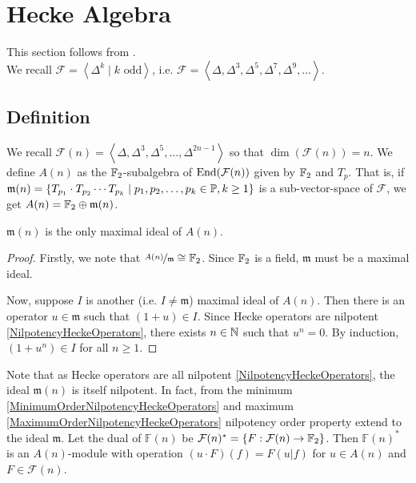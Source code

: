 \section{Hecke Algebra}
This section follows from \cite{StructureAlgebreHecke}.\\
We recall $\mathcal{F} = \left\langle \Delta^k \mid k \text{ odd} \right\rangle$, i.e. $\mathcal{F} = \left\langle \Delta, \Delta^3, \Delta^5, \Delta^7, \Delta^9, \dots \right\rangle$.
\subsection{Definition}
We recall $ \mathcal{F}(n) = \left\langle \Delta, \Delta^3, \Delta^5, \dots, \Delta^{2n-1} \right\rangle $ so that $\dim(\mathcal{F}(n)) = n$.
We define $A(n)$ as the $\mathbb{F}_2$-subalgebra of $\text{End}(\mathcal{F}(n))$ given by $\mathbb{F}_2$ and $T_p$.
That is, if $\mathfrak{m}(n) = \{T_{p_1} \cdot T_{p_2} \cdots T_{p_k} \mid p_1, p_2, \dots, p_k \in \mathbb{P}, k\geq 1\}$ is a sub-vector-space of $\mathcal{F}$, we get $A(n) = \mathbb{F}_2 \oplus \mathfrak{m}(n)$.

\begin{property}
	$\mathfrak{m}(n)$ is the only maximal ideal of $A(n)$.
\end{property}
\label{AisLocalAlgebra}
\begin{proof}
	Firstly, we note that $\nicefrac{A(n)}{\mathfrak{m}} \cong \mathbb{F}_2$.
	Since $\mathbb{F}_2$ is a field, $\mathfrak{m}$ must be a maximal ideal.
	
	Now, suppose $I$ is another (i.e. $I \neq \mathfrak{m}$) maximal ideal of $A(n)$.
	Then there is an operator $u \in \mathfrak{m}$ such that $(1+u) \in I$.
	Since Hecke operators are nilpotent \ref{NilpotencyHeckeOperators}, there exists $n \in \mathbb{N}$ such that $u^n=0$.
	By induction, $(1+u^n) \in I$ for all $n \geq 1$.
\end{proof}

Note that as Hecke operators are all nilpotent \ref{NilpotencyHeckeOperators}, the ideal $\mathfrak{m}(n)$ is itself nilpotent.
In fact, from the minimum \ref{MinimumOrderNilpotencyHeckeOperators} and maximum \ref{MaximumOrderNilpotencyHeckeOperators} nilpotency order property extend to the ideal $\mathfrak{m}$.
Let the dual of $\mathbb{F}(n)$ be $\mathcal{F}(n)^* = \{ F: \mathcal{F}(n) \to \mathbb{F}_2 \}$.
Then $\mathbb{F}(n)^*$ is an $A(n)$-module with operation 
$ (u \cdot F)(f) = F(u | f) $ for $u \in A(n)$ and $F \in \mathcal{F}(n)$.

